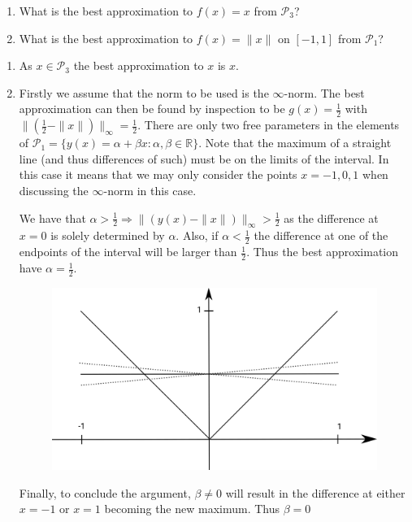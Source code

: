 \begin{problem}
  \begin{enumerate}
    \item What is the best approximation to $f(x) = x$ from
      $\mathcal{P}_3$?
    \item What is the best approximation to $f(x) = \|x\|$ on $[-1, 1]$
      from $\mathcal{P}_1$?
  \end{enumerate}
\end{problem}

\begin{solution}
  \begin{enumerate}
    \item As $x \in \mathcal{P}_3$ the best approximation to $x$ is
      $x$.
    \item Firstly we assume that the norm to be used is the
      $\infty$-norm. The best approximation can then be found by
      inspection to be $g(x) = \frac{1}{2}$ with $\|(\frac{1}{2} -
      \|x\|)\|_\infty = \frac{1}{2}$. There are only two free
      parameters in the elements of $\mathcal{P}_1 = \{y(x)= \alpha +
      \beta x:\alpha,\beta \in \mathds{R}\}$. Note that the maximum of
      a straight line (and thus differences of such) must be on the
      limits of the interval. In this case it means that we may only
      consider the points $x=-1, 0, 1$ when discussing the
      $\infty$-norm in this case.
      
      We have that $\alpha > \frac{1}{2} \Rightarrow \|(y(x) -
      \|x\|)\|_\infty > \frac{1}{2}$ as the difference at $x=0$ is
      solely determined by $\alpha$. Also, if $\alpha < \frac{1}{2}$
      the difference at one of the endpoints of the interval will be
      larger than $\frac{1}{2}$. Thus the best approximation have
      $\alpha=\frac{1}{2}$.

      \begin{figure}[!ht]
        \centering \includegraphics[scale = 0.1]{drawing_task_6.png}
        \label{fig:task_6}
      \end{figure}

      Finally, to conclude the argument, $\beta \neq 0$ will result in
      the difference at either $x=-1$ or $x=1$ becoming the new
      maximum. Thus $\beta = 0$
  \end{enumerate}
\end{solution}

 
